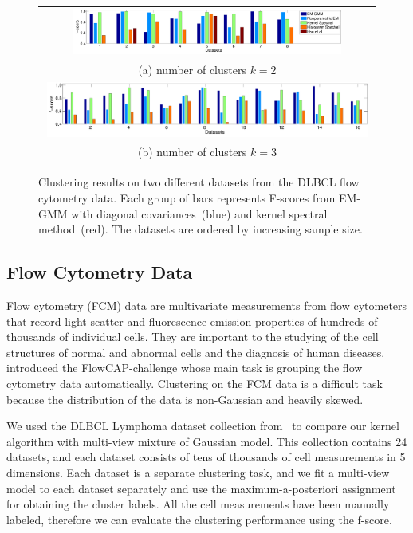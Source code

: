 \documentclass{article}
\begin{document}
\begin{figure}[t!]
  \centering
	\begin{tabular}{c}
		\includegraphics[width=0.82\textwidth]{../experiment/figure_new/paired_bar_chat_k_2} \\[-2mm]
		(a) number of clusters $k=2$ \\[-1mm]
		\includegraphics[width=0.98\textwidth]{../experiment/figure_new/paired_bar_chat_k_3}  \\[-2mm]
		(b) number of clusters $k=3$
	\end{tabular}
  \vspace{-4mm}
  \caption{Clustering results on two different datasets from the DLBCL flow cytometry data. Each group of bars represents F-scores from EM-GMM with diagonal covariances~(blue) and kernel spectral method~(red). The datasets are ordered by increasing sample size.}\label{fig:real_data}
  \vspace{-3mm}
\end{figure}

\vspace{-3mm}
\subsection{Flow Cytometry Data}
\vspace{-2mm}
% 

Flow cytometry (FCM) data are multivariate measurements from flow cytometers that record light scatter and fluorescence emission properties of hundreds of thousands of individual cells. They are important to the studying of the cell structures of normal and abnormal cells and the diagnosis of human diseases. \citet{AghFinEtal13} introduced the FlowCAP-challenge whose main task is grouping the flow cytometry data automatically. Clustering on the FCM data is a difficult task because the distribution of the data is non-Gaussian and heavily skewed.

We used the DLBCL Lymphoma dataset collection from~\cite{AghFinEtal13} to compare our kernel algorithm with multi-view mixture of Gaussian model.
This collection contains 24 datasets, and each dataset consists of tens of thousands of cell measurements in 5 dimensions. Each dataset is a separate clustering task, and we fit a multi-view model to each dataset separately and use the maximum-a-posteriori assignment for obtaining the cluster labels.  All the cell measurements have been manually labeled, therefore we can evaluate the clustering performance using the f-score.
\end{document}
